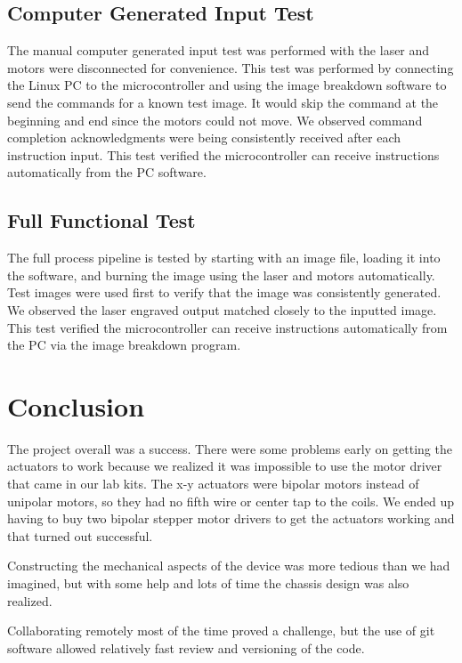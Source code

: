 \documentclass[11pt]{LaTeX-Classes/math-hw}
\begin{document}
\subsection{Computer Generated Input Test}
The manual computer generated input test was performed with
the laser and motors were disconnected for convenience. This test was performed by
connecting the Linux PC to the microcontroller and using the image breakdown software to send the commands for
a known test image. It would skip the  command at the beginning and end since the motors
could not move.
We observed command completion acknowledgments were being consistently received after each instruction input.
This test verified the microcontroller can receive instructions automatically from the PC software.

\subsection{Full Functional Test}
The full process pipeline is tested by starting with an image file, loading it into the software,
and burning the image using the laser and motors automatically.
Test images were used first to verify that the image was consistently generated. We observed the laser engraved output matched closely to the inputted image. This test verified the microcontroller can receive instructions automatically from the PC via the image breakdown program.

\section{Conclusion}
The project overall was a success. There were some problems early on getting the actuators to work because we realized it was impossible to use the motor driver that came in our lab kits.
The x-y actuators were bipolar motors instead of unipolar motors, so they had no fifth wire or center tap to the coils. We ended up having to buy two bipolar stepper motor drivers to get the actuators working and that turned out successful.

Constructing the mechanical aspects of the device was more tedious than we had imagined,
but with some help and lots of time the chassis design was also realized. 

Collaborating remotely most of the time proved a challenge, but the use of git software allowed
relatively fast review and versioning of the code.
\end{document}
